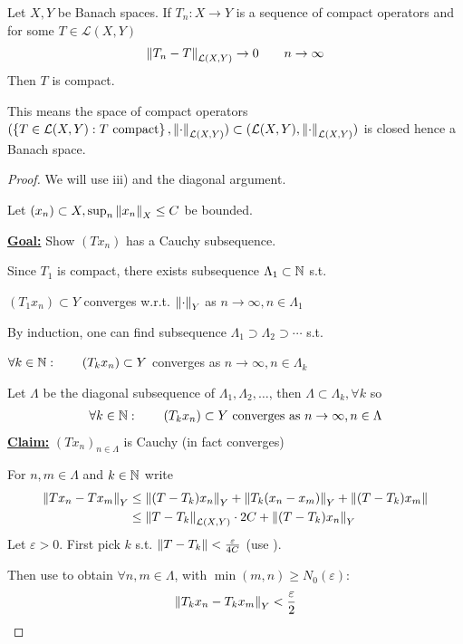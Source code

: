 \documentclass{article}
\begin{document}
\begin{theorem}\nl
\label{limit of compact operators}
    Let $X, Y$ be Banach spaces. If $T_n: X\to Y$ is a sequence of compact operators and for some $T \in \mathcal{L}(X,Y)$  
    \begin{align}
    \label{converging seq of compact operators}
      \left\|{T_n-T}\right\|_{\mathcal{L}(X,Y)} \to 0 \qquad n\to \infty    
    \end{align}
    Then $T$ is compact.
\end{theorem}  
\begin{remark}
    This means the space of compact operators $(\left\{T \in \mathcal{L}(X,Y): T \ \text{compact} \right\}, \left\|{\cdot}\right\|_{\mathcal{L}(X,Y)}) \subset (\mathcal{L}(X,Y), \left\|{\cdot}\right\|_{\mathcal{L}(X,Y)})$ is closed hence a Banach space.
\end{remark}
\begin{proof}
    We will use  iii) and the diagonal argument.  

    Let $(x_n)\subset X, \sup_n \left\|{x_n}\right\|_X \leq C$ be bounded.  
    
    \underline{\textbf{Goal:}} Show $(Tx_n)$ has a Cauchy subsequence.  

    Since $T_1$ is compact, there exists subsequence $\Lambda_1 \subset \mathbb{N}$ s.t.  
    \begin{center}
        $(T_1 x_n) \subset Y$ converges w.r.t. $\left\|{\cdot}\right\|_Y$ as $n\to \infty, n\in \Lambda_1$   
    \end{center}
    By induction, one can find subsequence $\Lambda_1 \supset \Lambda_2 \supset \cdots$ s.t.  
    \begin{center}
        $\forall k \in \mathbb{N}: \qquad (T_k x_n) \subset Y$ converges as $n\to \infty, n\in \Lambda_k$
    \end{center}
    Let $\Lambda$ be the diagonal subsequence of $\Lambda_1, \Lambda_2, \ldots$, then $\Lambda \subset \Lambda_k, \forall k$ so  
    \begin{align}
    \label{convergence of diagonal of compact operators}
        \forall k \in \natu: \qquad (T_k x_n) \subset Y \ \text{converges\ as} \  n\to \infty, n\in \Lambda
    \end{align}
    \underline{\textbf{Claim:}} $(Tx_n)_{n\in \Lambda}$ is Cauchy (in fact converges)  
    
    For $n,m\in \Lambda$ and $k\in \mathbb{N}$ write
    \begin{align*}
        \left\|{Tx_n - Tx_m}\right\|_Y &\leq \left\|{(T-T_k)x_n}\right\|_Y + \left\|{T_k(x_n-x_m)}\right\|_Y + \left\|{(T-T_k)x_m}\right\|  \\
        &\leq \left\|{T-T_k}\right\|_{\mathcal{L}(X,Y)} \cdot 2C + \left\|{(T-T_k)x_n}\right\|_Y
    \end{align*}
    Let $\varepsilon >0$. First pick $k$ s.t. $\left\|{T-T_k}\right\| < \frac{\varepsilon}{4C}$ (use ).  
    
    Then use  to obtain $\forall n,m \in \Lambda$, with $\min (m,n) \geq N_0(\varepsilon)$:  
    $$
    \left\|{T_kx_n-T_kx_m}\right\|_Y < \frac{\varepsilon}{2}
    $$
\end{proof}
\end{document}
